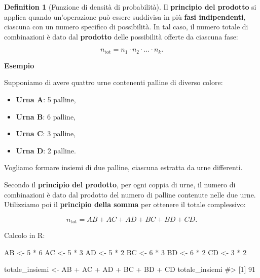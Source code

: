 \documentclass[
  letterpaper,
  DIV=11,
  numbers=noendperiod,
  oneside]{scrreprt}
\newenvironment{Shaded}{\begin{snugshade}}{\end{snugshade}}
\newcommand{\CommentTok}[1]{\textcolor[rgb]{0.37,0.37,0.37}{#1}}
\newcommand{\DecValTok}[1]{\textcolor[rgb]{0.68,0.00,0.00}{#1}}
\newcommand{\NormalTok}[1]{\textcolor[rgb]{0.00,0.23,0.31}{#1}}
\newcommand{\OtherTok}[1]{\textcolor[rgb]{0.00,0.23,0.31}{#1}}
\newcommand{\SpecialCharTok}[1]{\textcolor[rgb]{0.37,0.37,0.37}{#1}}
\providecommand{\tightlist}{%
  \setlength{\itemsep}{0pt}\setlength{\parskip}{0pt}}
\theoremstyle{definition}
\theoremstyle{plain}
\theoremstyle{definition}
\newtheorem{definition}{Definition}[chapter]
\theoremstyle{remark}
\begin{document}
\begin{definition}[Funzione di densità di
probabilità]
Il \textbf{principio del prodotto} si applica quando un'operazione può
essere suddivisa in più \textbf{fasi indipendenti}, ciascuna con un
numero specifico di possibilità. In tal caso, il numero totale di
combinazioni è dato dal \textbf{prodotto} delle possibilità offerte da
ciascuna fase:

\[
n_{\text{tot}} = n_1 \cdot n_2 \cdot \dots \cdot n_k .
\]

\textbf{Esempio}

Supponiamo di avere quattro urne contenenti palline di diverso colore:

\begin{itemize}
\tightlist
\item
  \textbf{Urna A}: 5 palline,\\
\item
  \textbf{Urna B}: 6 palline,\\
\item
  \textbf{Urna C}: 3 palline,\\
\item
  \textbf{Urna D}: 2 palline.
\end{itemize}

Vogliamo formare insiemi di due palline, ciascuna estratta da urne
differenti.

Secondo il \textbf{principio del prodotto}, per ogni coppia di urne, il
numero di combinazioni è dato dal prodotto del numero di palline
contenute nelle due urne. Utilizziamo poi il \textbf{principio della
somma} per ottenere il totale complessivo:

\[
n_{\text{tot}} = AB + AC + AD + BC + BD + CD.
\]

Calcolo in R:

\begin{Shaded}
\begin{Highlighting}[]
\NormalTok{AB }\OtherTok{\textless{}{-}} \DecValTok{5} \SpecialCharTok{*} \DecValTok{6}
\NormalTok{AC }\OtherTok{\textless{}{-}} \DecValTok{5} \SpecialCharTok{*} \DecValTok{3}
\NormalTok{AD }\OtherTok{\textless{}{-}} \DecValTok{5} \SpecialCharTok{*} \DecValTok{2}
\NormalTok{BC }\OtherTok{\textless{}{-}} \DecValTok{6} \SpecialCharTok{*} \DecValTok{3}
\NormalTok{BD }\OtherTok{\textless{}{-}} \DecValTok{6} \SpecialCharTok{*} \DecValTok{2}
\NormalTok{CD }\OtherTok{\textless{}{-}} \DecValTok{3} \SpecialCharTok{*} \DecValTok{2}

\NormalTok{totale\_insiemi }\OtherTok{\textless{}{-}}\NormalTok{ AB }\SpecialCharTok{+}\NormalTok{ AC }\SpecialCharTok{+}\NormalTok{ AD }\SpecialCharTok{+}\NormalTok{ BC }\SpecialCharTok{+}\NormalTok{ BD }\SpecialCharTok{+}\NormalTok{ CD}
\NormalTok{totale\_insiemi}
\CommentTok{\#\textgreater{} [1] 91}
\end{Highlighting}
\end{Shaded}


\end{definition}
\end{document}
